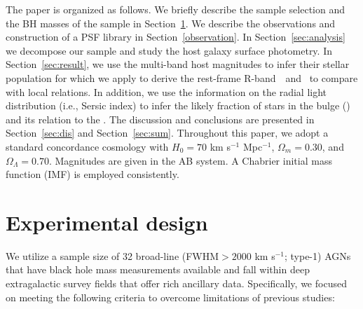 \documentclass[apj]{emulateapj}
\begin{document}
The paper is organized as follows. We briefly describe the sample selection and the BH masses of the sample in Section~\ref{sec:data}. We describe the observations and construction of a PSF library in Section~\ref{observation}. In Section~\ref{sec:analysis} we decompose our sample and study the host galaxy surface photometry. In Section~\ref{sec:result}, we use the multi-band host magnitudes to infer their stellar population for which we apply to derive the rest-frame R-band \lhost\,~and \smass\ to compare with local relations. In addition, we use the information on the radial light distribution (i.e., Sersic index) to infer the likely fraction of stars in the bulge (\bmass) and its relation to the \mbh. The discussion and conclusions are presented in Section~\ref{sec:dis} and Section~\ref{sec:sum}. Throughout this paper, we adopt a standard concordance cosmology with $H_0= 70$ km s$^{-1}$ Mpc$^{-1}$, $\Omega{_m} = 0.30$, and $\Omega{_\Lambda} = 0.70$. Magnitudes are given in the AB system. A Chabrier initial mass function (IMF) is employed consistently.


\section{Experimental design}
\label{sec:data}

We utilize a sample size of 32 broad-line (FWHM$>2000$ km s$^{-1}$; type-1) AGNs that have black hole mass measurements available and fall within deep extragalactic survey fields that offer rich ancillary data. Specifically, we focused on meeting the following criteria to overcome limitations of previous studies:
\end{document}
